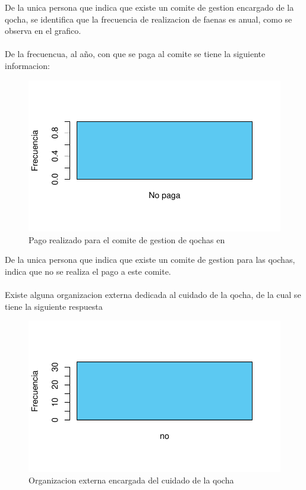 \documentclass[12pt]{article}\usepackage[]{graphicx}\usepackage[]{xcolor}
\makeatletter
\def\maxwidth{ %
  \ifdim\Gin@nat@width>\linewidth
    \linewidth
  \else
    \Gin@nat@width
  \fi
}
\newenvironment{knitrout}{}{} %
\makeatother
\begin{document}
	De la unica persona que indica que existe un comite de gestion encargado de la qocha, se identifica que la frecuencia de realizacion de faenas es anual, como se observa en el grafico.\\
	\\
	De la frecuencua, al año, con que se paga al comite se tiene la siguiente informacion:
	\begin{figure}[H]
	\centering
\begin{knitrout}
\color{fgcolor}
\includegraphics[width=\maxwidth]{figure/veinticinco-1} 
\end{knitrout}
	\caption{Pago realizado para el comite de gestion de qochas en \comunidad}
	\end{figure}
	De la unica persona que indica que existe un comite de gestion para las qochas, indica que no se realiza el pago a este comite.\\
	\\
	Existe alguna organizacion externa dedicada al cuidado de la qocha, de la cual se tiene la siguiente respuesta
	\begin{figure}[H]
	\centering
\begin{knitrout}
\color{fgcolor}
\includegraphics[width=\maxwidth]{figure/veintiseis-1} 
\end{knitrout}
	\caption{Organizacion externa encargada del cuidado de la qocha}
	\end{figure}
\end{document}
